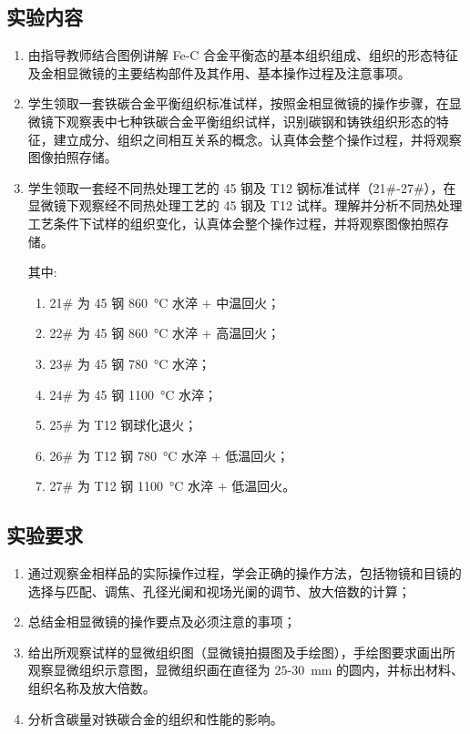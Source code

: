 \documentclass[a4paper,utf8]{article}
\begin{document}
    \subsection{实验内容}
        \begin{enumerate}
            \item 由指导教师结合图例讲解 Fe-C 合金平衡态的基本组织组成、组织的形态特征及金相显微镜的主要结构部件及其作用、基本操作过程及注意事项。
            \item 学生领取一套铁碳合金平衡组织标准试样，按照金相显微镜的操作步骤，在显微镜下观察表中七种铁碳合金平衡组织试样，识别碳钢和铸铁组织形态的特征，建立成分、组织之间相互关系的概念。认真体会整个操作过程，并将观察图像拍照存储。
            \item 学生领取一套经不同热处理工艺的 45 钢及 T12 钢标准试样（21\#-27\#），在显微镜下观察经不同热处理工艺的 45 钢及 T12 试样。理解并分析不同热处理工艺条件下试样的组织变化，认真体会整个操作过程，并将观察图像拍照存储。\par
            其中:\begin{enumerate}
                \item 21\# 为 45 钢 \SI{860}{\degreeCelsius} 水淬 $+$ 中温回火；
                \item 22\# 为 45 钢 \SI{860}{\degreeCelsius} 水淬 $+$ 高温回火；
                \item 23\# 为 45 钢 \SI{780}{\degreeCelsius} 水淬；
                \item 24\# 为 45 钢 \SI{1100}{\degreeCelsius} 水淬；
                \item 25\# 为 T12 钢球化退火；
                \item 26\# 为 T12 钢 \SI{780}{\degreeCelsius} 水淬 $+$ 低温回火；
                \item 27\# 为 T12 钢 \SI{1100}{\degreeCelsius} 水淬 $+$ 低温回火。
            \end{enumerate}
        \end{enumerate}
    \subsection{实验要求}
        \begin{enumerate}
            \item 通过观察金相样品的实际操作过程，学会正确的操作方法，包括物镜和目镜的选择与匹配、调焦、孔径光阑和视场光阑的调节、放大倍数的计算；
            \item 总结金相显微镜的操作要点及必须注意的事项；
            \item 给出所观察试样的显微组织图（显微镜拍摄图及手绘图），手绘图要求画出所观察显微组织示意图，显微组织画在直径为 $25$-\SI{30}{\mm} 的圆内，并标出材料、组织名称及放大倍数。
            \item  分析含碳量对铁碳合金的组织和性能的影响。
        \end{enumerate}
\end{document}
